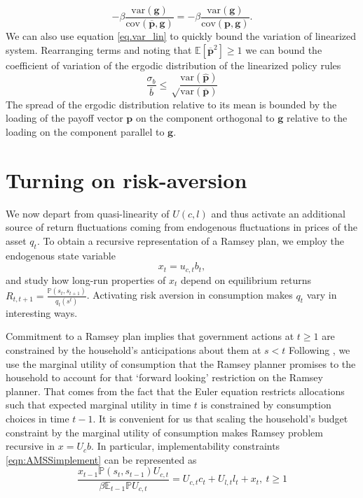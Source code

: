 \documentclass[12pt]{article}
\newcommand{\EE}{\mathbb E}
\newcommand{\var}{\text{var}}
\newcommand{\cov}{\text{cov}}
\begin{document}
\[
	 -\beta \frac{\var(\bm g)}{\cov(\overline{\bm p},\bm g)} =  -\beta \frac{\var(\bm g)}{\cov(\bm p,\bm g)}.
\]  We can also use equation \eqref{eq.var_lin} to quickly bound the variation of linearized system.  Rearranging terms and noting that $\EE[\overline{\bm p}^2] \geq 1$ we can bound the coefficient of variation of the ergodic distribution of the linearized policy rules
\begin{equation}
	\frac{\sigma_b}{\overline b} \leq \sqrt\frac{\var(\hat{\bm p})}{\var(\overline{\bm p})}
\end{equation}  The spread of the ergodic distribution relative to its mean is bounded by the loading of the payoff vector $\bm p$ on the component orthogonal to $\bm g$ relative to the loading on the component parallel to $\bm g$.
\section{Turning on risk-aversion}

  We now depart from quasi-linearity of $U(c,l)$ and thus activate an additional source of return fluctuations coming from endogenous fluctuations in prices of the asset $q_t$.  To obtain a recursive representation of a Ramsey plan,
  we employ the endogenous state variable
  \[x_t=u_{c,t}b_{t} ,\]
  and study how long-run properties of $x_t$ depend on equilibrium returns $R_{t,t+1}=\frac{\mathbb{P}(s_t,s_{t+1})}{q_t(s^t)}$.
   Activating risk aversion in consumption makes $q_t$ vary in interesting ways.

  Commitment to a Ramsey plan implies that government actions at $t \geq 1$ are constrained by the household's anticipations about them at $s < t$
	 Following \citet{Kydland1980}, we  use the  marginal utility of consumption that the
Ramsey planner promises to the household to account for that `forward looking' restriction on the Ramsey planner. That
comes from the fact that the Euler equation restricts allocations such that expected marginal utility in time $t$ is constrained by consumption choices
in time $t-1$.  It is convenient for us that scaling the household's  budget constraint by the  marginal utility
 of consumption makes Ramsey problem  recursive in  $x=U_c b$.  In particular, implementability constraints \eqref{eqn:AMSSimplement}
 can be represented as
		\begin{equation}
		\frac{x_{t-1} \mathbb{P}(s_t,s_{t-1}) U_{c,t}}{\beta \EE_{t-1} \mathbb{P}U_{c,t}}  = U_{c,t}c_t+U_{l,t} l_t + x_t, \ t \geq 1
	\end{equation}
\end{document}

